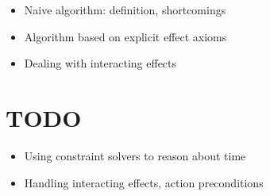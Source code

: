 \begin{itemize}
\item Naive algorithm: definition, shortcomings
\item Algorithm based on explicit effect axioms
\item Dealing with interacting effects
\end{itemize}

\section{TODO}
\begin{itemize}
\item Using constraint solvers to reason about time
\item Handling interacting effects, action preconditions
\end{itemize}

